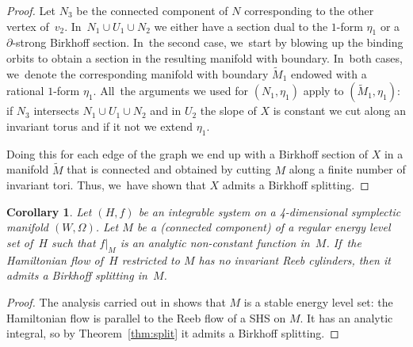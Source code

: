 \documentclass[11pt]{article}
\newtheorem{Corollary}[theorem]{Corollary}
\theoremstyle{definition}
\begin{document}
\begin{proof}
Let $N_3$ be the connected component of $N$ corresponding to the other vertex of~$v_2$. In~$N_1\cup U_1\cup N_2$ we either have a section dual to the $1$-form $\eta_1$ or a $\partial$-strong Birkhoff section. In~the second case, we~start by blowing up the binding orbits to obtain a section in the resulting manifold with boundary. In~both cases, we~denote the corresponding manifold with boundary $\widetilde{M}_1$ endowed with a rational $1$-form $\eta_1$.
All~the arguments we used for $(N_1,\eta_1)$ apply to $(\widetilde{M}_1,\eta_1)$: if $N_3$ intersects $N_1\cup U_1\cup N_2$ and in $U_2$ the slope of $X$ is constant we cut along an invariant torus and if it not we extend $\eta_1$.

Doing this for each edge of the graph we end up
with a Birkhoff section of $X$ in a manifold $\widetilde M$ that is connected and obtained by cutting $M$ along a finite number of invariant tori. Thus, we~have shown that $X$ admits a Birkhoff splitting.
\end{proof}

\begin{Corollary}
Let $(H,f)$ be an integrable system on a 4-dimensional symplectic manifold $(W,\Omega)$. Let $M$ be a (connected component) of a regular energy level set of~$H$ such that $f|_M$ is an analytic non-constant function in~$M$. If~the Hamiltonian flow of~$H$ restricted to $M$ has no invariant Reeb cylinders, then it admits a Birkhoff splitting in~$M$.
\end{Corollary}

\begin{proof}
The analysis carried out in \cite[\S\S 2 \& 3]{CV2} shows that $M$ is a stable energy level set: the Hamiltonian flow is parallel to the Reeb flow of a SHS on $M$. It has an analytic integral, so by Theorem~\ref{thm:split} it admits a Birkhoff splitting.
\end{proof}


\end{document}
